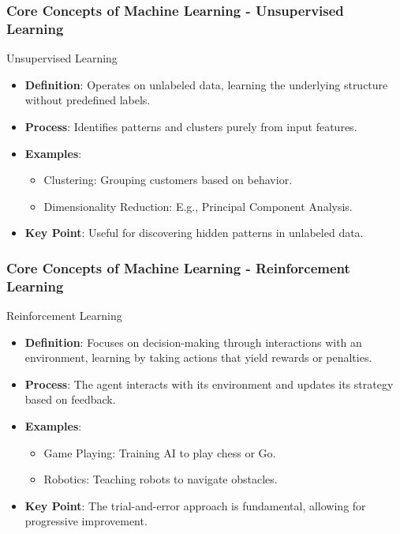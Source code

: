 \documentclass{beamer}
\begin{document}
\begin{frame}[fragile]
    \frametitle{Core Concepts of Machine Learning - Unsupervised Learning}
    \begin{block}{Unsupervised Learning}
        \begin{itemize}
            \item \textbf{Definition}: Operates on unlabeled data, learning the underlying structure without predefined labels.
            \item \textbf{Process}: Identifies patterns and clusters purely from input features.
            \item \textbf{Examples}:
            \begin{itemize}
                \item Clustering: Grouping customers based on behavior.
                \item Dimensionality Reduction: E.g., Principal Component Analysis.
            \end{itemize}
            \item \textbf{Key Point}: Useful for discovering hidden patterns in unlabeled data.
        \end{itemize}
    \end{block}
\end{frame}

\begin{frame}[fragile]
    \frametitle{Core Concepts of Machine Learning - Reinforcement Learning}
    \begin{block}{Reinforcement Learning}
        \begin{itemize}
            \item \textbf{Definition}: Focuses on decision-making through interactions with an environment, learning by taking actions that yield rewards or penalties.
            \item \textbf{Process}: The agent interacts with its environment and updates its strategy based on feedback.
            \item \textbf{Examples}:
            \begin{itemize}
                \item Game Playing: Training AI to play chess or Go.
                \item Robotics: Teaching robots to navigate obstacles.
            \end{itemize}
            \item \textbf{Key Point}: The trial-and-error approach is fundamental, allowing for progressive improvement.
        \end{itemize}
    \end{block}
\end{frame}
\end{document}
